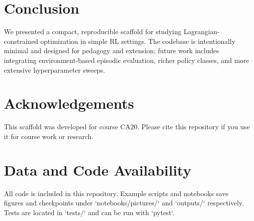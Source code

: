 \section{Conclusion}

We presented a compact, reproducible scaffold for studying Lagrangian-constrained optimization in simple RL settings. The codebase is intentionally minimal and designed for pedagogy and extension; future work includes integrating environment-based episodic evaluation, richer policy classes, and more extensive hyperparameter sweeps.

\section*{Acknowledgements}

This scaffold was developed for course CA20. Please cite this repository if you use it for course work or research.

\section*{Data and Code Availability}

All code is included in this repository. Example scripts and notebooks save figures and checkpoints under `notebooks/pictures/` and `outputs/` respectively. Tests are located in `tests/` and can be run with `pytest`.




